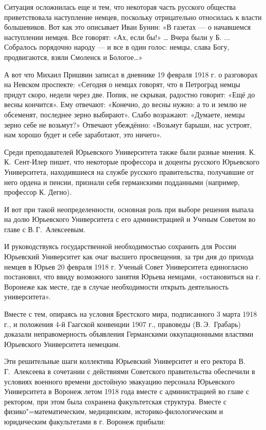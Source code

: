 Ситуация осложнилась еще и тем, что некоторая часть русского общества приветствовала наступление немцев,
поскольку отрицательно относилась к власти большевиков.
Вот как это описывает Иван Бунин: «В газетах --- о начавшемся наступлении немцев. Все говорят: «Ах, если бы!» … Вчера были у Б. ... Собралось порядочно народу --- и все в один голос: немцы, слава Богу, продвигаются, взяли Смоленск и Бологое…»

А	вот что Михаил Пришвин записал в дневнике 19 февраля 1918 г. о разговорах на Невском проспекте: «Сегодня о немцах говорят, что в Петроград немцы придут скоро, недели через две. Попик, не скрывая, радостно говорит: «Ещё до весны кончится». Ему отвечают: «Конечно, до весны нужно: а то и землю не обсеменят, последнее зерно выбирают». Слабо возражают: «Думаете, немцы зерно себе не возьмут?» Отвечают убеждённо: «Возьмут барыши, нас устроят, нам хорошо будет и себе заработают, это ничего».

Среди преподавателей Юрьевского Университета также были разные мнения. К.\,К.~Сент-Илер пишет, что некоторые профессора и доценты русского Юрьевского Университета, находившиеся на службе русского правительства, получавшие от него ордена и пенсии, признали себя германскими подданными (например, профессор К. Дегио).

И вот при такой неопределенности, основная роль при выборе решения выпала на долю Юрьевского Университета с его администрацией и Ученым Советом во главе с В.\,Г.~Алексеевым.

И	руководствуясь государственной необходимостью сохранить для России Юрьевский Университет как очаг высшего просвещения, за три дня до прихода немцев в Юрьев 20 февраля 1918 г. Ученый Совет Университета единогласно постановил, что ввиду возможного занятия Юрьева немцами, «остановиться на г. Воронеже как месте, где в случае необходимости открыть деятельность университета».

Вместе с тем, опираясь на условия Брестского мира, подписанного 3 марта 1918 г., и положения 4-й Гаагской конвенции 1907 г., правоведы (В.\,Э.~Грабарь) доказали неправомерность объявления Германскими оккупационными властями Юрьевского Университета немецким.

Эти решительные шаги коллектива Юрьевский Университет и	его ректора В.\,Г.~Алексеева в сочетании с действиями Советского правительства обеспечили в условиях военного времени достойную эвакуацию персонала Юрьевского Университета в Воронеж летом 1918 года вместе с администрацией во главе с ректором, при этом была сохранена факультетская структура.
Вместе с физико"=математическим, медицинским, историко-филологическим и юридическим факультетами в г. Воронеж прибыли:

